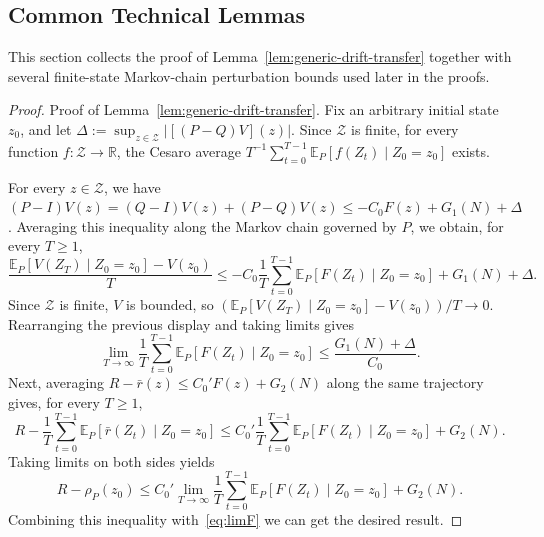 \documentclass[mnsc,nonblindrev]{informs3}
\begin{document}
\begin{APPENDICES}
\section{Common Technical Lemmas}
\label{sec:common-technical-lemmas}

This section collects the proof of Lemma~\ref{lem:generic-drift-transfer} together with several
finite-state Markov-chain perturbation bounds used later in the proofs.

\begin{proof}{Proof of Lemma~\ref{lem:generic-drift-transfer}.}
Fix an arbitrary initial state \(z_0\), and let
\(\Delta:=\sup_{z\in\mathcal Z}|[(P-Q)V](z)|\). Since \(\mathcal Z\) is
finite, for every function \(f:\mathcal Z\to\mathbb R\), the Cesaro average
\(T^{-1}\sum_{t=0}^{T-1}\mathbb E_P[f(Z_t)\mid Z_0=z_0]\) exists.

For every \(z\in\mathcal Z\), we have
\((P-I)V(z)=(Q-I)V(z)+(P-Q)V(z)\le -C_0F(z)+G_1(N)+\Delta\). Averaging this
inequality along the Markov chain governed by \(P\), we obtain, for every
\(T\ge1\),
\[
    \frac{\mathbb E_P[V(Z_T)\mid Z_0=z_0]-V(z_0)}{T}
    \le
    -C_0
    \frac1T
    \sum_{t=0}^{T-1}
    \mathbb E_P[F(Z_t)\mid Z_0=z_0]
    +
    G_1(N)+\Delta .
\]
Since \(\mathcal Z\) is finite, \(V\) is bounded, so
\((\mathbb E_P[V(Z_T)\mid Z_0=z_0]-V(z_0))/T\to0\). Rearranging the previous
display and taking limits gives
\begin{equation}\label{eq:limF}
    \lim_{T\to\infty}
    \frac1T
    \sum_{t=0}^{T-1}
    \mathbb E_P[F(Z_t)\mid Z_0=z_0]
    \le
    \frac{G_1(N)+\Delta}{C_0}.
\end{equation}
Next, averaging \(R-\bar r(z)\le C_0'F(z)+G_2(N)\) along the same trajectory
gives, for every \(T\ge1\),
\[
    R-
    \frac1T
    \sum_{t=0}^{T-1}
    \mathbb E_P[\bar r(Z_t)\mid Z_0=z_0]
    \le
    C_0'
    \frac1T
    \sum_{t=0}^{T-1}
    \mathbb E_P[F(Z_t)\mid Z_0=z_0]
    +
    G_2(N).
\]
Taking limits on both sides yields
\[
    R-\rho_P(z_0)
    \le
    C_0'
    \lim_{T\to\infty}
    \frac1T
    \sum_{t=0}^{T-1}
    \mathbb E_P[F(Z_t)\mid Z_0=z_0]
    +
    G_2(N).
\]
Combining this inequality with~\eqref{eq:limF} we can get the desired result.
\end{proof}


\end{APPENDICES}
\end{document}

